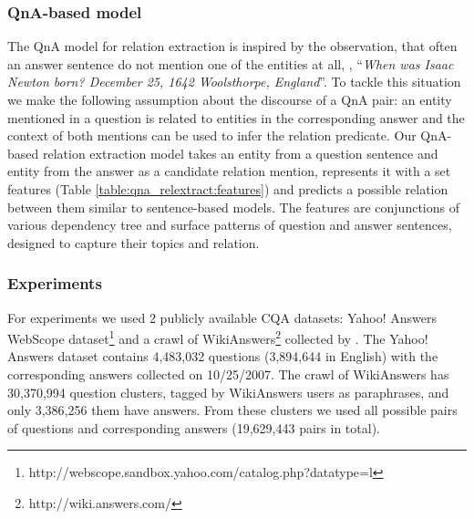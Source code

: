 \subsubsection{QnA-based model}
The QnA model for relation extraction is inspired by the observation, that often an answer sentence do not mention one of the entities at all, \eg, ``\textit{When was Isaac Newton born? December 25, 1642 Woolsthorpe, England}''.
To tackle this situation we make the following assumption about the discourse of a QnA pair: an entity mentioned in a question is related to entities in the corresponding answer and the context of both mentions can be used to infer the relation predicate.
Our QnA-based relation extraction model takes an entity from a question sentence and entity from the answer as a candidate relation mention, represents it with a set features (Table \ref{table:qna_relextract:features}) and predicts a possible relation between them similar to sentence-based models.
The features are conjunctions of various dependency tree and surface patterns of question and answer sentences, designed to capture their topics and relation.

\subsubsection{Experiments}

For experiments we used 2 publicly available CQA datasets: Yahoo! Answers WebScope dataset\footnote{http://webscope.sandbox.yahoo.com/catalog.php?datatype=l} and a crawl of WikiAnswers\footnote{http://wiki.answers.com/} collected by \cite{Fader:2014:OQA:2623330.2623677}.
The Yahoo! Answers dataset contains 4,483,032 questions (3,894,644 in English) with the corresponding answers collected on 10/25/2007.
The crawl of WikiAnswers has 30,370,994 question clusters, tagged by WikiAnswers users as paraphrases, and only 3,386,256 them have answers.
From these clusters we used all possible pairs of questions and corresponding answers (19,629,443 pairs in total).

